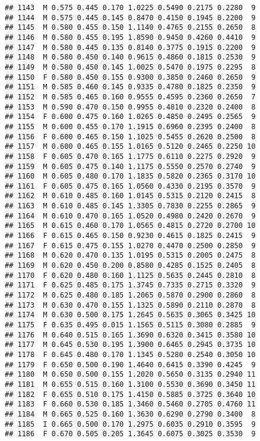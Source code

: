 \documentclass[
]{article}
\begin{document}
\begin{verbatim}
## 1143  M 0.575 0.445 0.170 1.0225 0.5490 0.2175 0.2280  9
## 1144  M 0.575 0.445 0.145 0.8470 0.4150 0.1945 0.2200  9
## 1145  M 0.580 0.455 0.150 1.1140 0.4765 0.2155 0.2650  8
## 1146  M 0.580 0.455 0.195 1.8590 0.9450 0.4260 0.4410  9
## 1147  M 0.580 0.445 0.135 0.8140 0.3775 0.1915 0.2200  9
## 1148  M 0.580 0.450 0.140 0.9615 0.4860 0.1815 0.2530  9
## 1149  M 0.580 0.450 0.145 1.0025 0.5470 0.1975 0.2295  8
## 1150  F 0.580 0.450 0.155 0.9300 0.3850 0.2460 0.2650  9
## 1151  M 0.585 0.460 0.145 0.9335 0.4780 0.1825 0.2350  9
## 1152  M 0.585 0.465 0.160 0.9555 0.4595 0.2360 0.2650  7
## 1153  M 0.590 0.470 0.150 0.9955 0.4810 0.2320 0.2400  8
## 1154  F 0.600 0.475 0.160 1.0265 0.4850 0.2495 0.2565  9
## 1155  M 0.600 0.455 0.170 1.1915 0.6960 0.2395 0.2400  8
## 1156  F 0.600 0.465 0.150 1.1025 0.5455 0.2620 0.2500  8
## 1157  M 0.600 0.465 0.155 1.0165 0.5120 0.2465 0.2250 10
## 1158  F 0.605 0.470 0.165 1.1775 0.6110 0.2275 0.2920  9
## 1159  M 0.605 0.475 0.140 1.1175 0.5550 0.2570 0.2740  9
## 1160  M 0.605 0.480 0.170 1.1835 0.5820 0.2365 0.3170 10
## 1161  F 0.605 0.475 0.165 1.0560 0.4330 0.2195 0.3570  9
## 1162  M 0.610 0.485 0.160 1.0145 0.5315 0.2120 0.2415  8
## 1163  M 0.610 0.485 0.145 1.3305 0.7830 0.2255 0.2865  9
## 1164  M 0.610 0.470 0.165 1.0520 0.4980 0.2420 0.2670  9
## 1165  M 0.615 0.460 0.170 1.0565 0.4815 0.2720 0.2700 10
## 1166  F 0.615 0.465 0.150 0.9230 0.4615 0.1825 0.2415  9
## 1167  F 0.615 0.475 0.155 1.0270 0.4470 0.2500 0.2850  9
## 1168  M 0.620 0.470 0.135 1.0195 0.5315 0.2005 0.2475  8
## 1169  M 0.620 0.450 0.200 0.8580 0.4285 0.1525 0.2405  8
## 1170  F 0.620 0.480 0.160 1.1125 0.5635 0.2445 0.2810  8
## 1171  F 0.625 0.485 0.175 1.3745 0.7335 0.2715 0.3320  9
## 1172  M 0.625 0.480 0.185 1.2065 0.5870 0.2900 0.2860  8
## 1173  M 0.630 0.470 0.155 1.1325 0.5890 0.2110 0.2870  8
## 1174  M 0.630 0.500 0.175 1.2645 0.5635 0.3065 0.3425 10
## 1175  F 0.635 0.495 0.015 1.1565 0.5115 0.3080 0.2885  9
## 1176  M 0.640 0.515 0.165 1.3690 0.6320 0.3415 0.3580 10
## 1177  M 0.645 0.530 0.195 1.3900 0.6465 0.2945 0.3735 10
## 1178  F 0.645 0.480 0.170 1.1345 0.5280 0.2540 0.3050 10
## 1179  F 0.650 0.500 0.190 1.4640 0.6415 0.3390 0.4245  9
## 1180  M 0.650 0.500 0.155 1.2020 0.5650 0.3135 0.2940 11
## 1181  M 0.655 0.515 0.160 1.3100 0.5530 0.3690 0.3450 11
## 1182  F 0.655 0.510 0.175 1.4150 0.5885 0.3725 0.3640 10
## 1183  F 0.660 0.530 0.185 1.3460 0.5460 0.2705 0.4760 11
## 1184  M 0.665 0.525 0.160 1.3630 0.6290 0.2790 0.3400  8
## 1185  I 0.665 0.500 0.170 1.2975 0.6035 0.2910 0.3595  9
## 1186  F 0.670 0.505 0.205 1.3645 0.6075 0.3025 0.3530  9

\end{verbatim}
\end{document}
